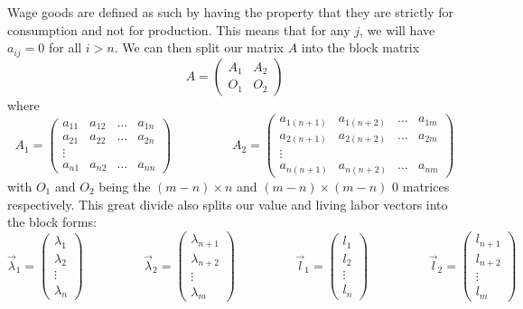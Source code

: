  Wage goods are defined as such by having the property that they are strictly for consumption and not for production. This means that for any $j$, we will have $a_{ij} = 0$ for all $i>n$. We can then split our matrix $A$ into the block matrix
\[ A = \begin{pmatrix} A_1 & A_2 \\ O_1 & O_2 \end{pmatrix} \]
where
\[ A_1 = \begin{pmatrix} a_{11} & a_{12} & \ldots & a_{1n} \\
			a_{21} & a_{22} & \ldots & a_{2n} \\
			\vdots \\ a_{n1} & a_{n2} & \ldots & a_{nn} \end{pmatrix} \hspace{2cm} A_2 = \begin{pmatrix} a_{1(n+1)} & a_{1(n+2)} & \ldots & a_{1m} \\
			a_{2(n+1)} & a_{2(n+2)} & \ldots & a_{2m} \\
			\vdots \\ a_{n(n+1)} & a_{n(n+2)} & \ldots & a_{nm} \end{pmatrix} \]
with $O_1$ and $O_2$ being the $(m-n)\times n$ and $(m-n) \times (m-n)$ $0$ matrices respectively. This great divide also splits our value and living labor vectors into the block forms:
 \[ \vec{\lambda}_1 = \begin{pmatrix} \lambda_1 \\ \lambda_2 \\ \vdots \\ \lambda_n \end{pmatrix} \hspace{2cm} \vec{\lambda}_2  = \begin{pmatrix} \lambda_{n+1} \\ \lambda_{n+2} \\ \vdots \\ \lambda_m \end{pmatrix} \hspace{2cm} \vec{l}_1  = \begin{pmatrix} l_1 \\ l_2 \\ \vdots \\ l_n \end{pmatrix} \hspace{2cm} \vec{l}_2  = \begin{pmatrix} l_{n+1} \\ l_{n+2} \\ \vdots \\ l_m \end{pmatrix} \]
